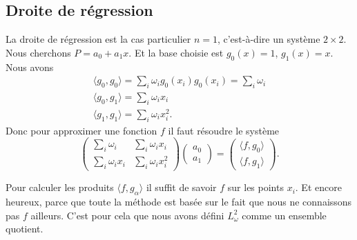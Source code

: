 \subsection{Droite de régression}

La droite de régression est la cas particulier \( n=1\), c'est-à-dire un système \( 2\times 2\). Nous cherchons \( P=a_0+a_1x\). Et la base choisie est \( g_0(x)=1\), \( g_1(x)=x\). Nous avons
\begin{subequations}
	\begin{align}
		\langle g_0, g_0\rangle =\sum_i\omega_ig_0(x_i)g_0(x_i)=\sum_i\omega_i \\
		\langle g_0, g_1\rangle =\sum_i\omega_ix_i                             \\
		\langle g_1, g_1\rangle =\sum_i\omega_ix_i^2.
	\end{align}
\end{subequations}
Donc pour approximer une fonction \( f\) il faut résoudre le système
\begin{equation}
	\begin{pmatrix}
		\sum_i\omega_i    & \sum_i\omega_ix_i   \\
		\sum_i\omega_ix_i & \sum_i\omega_ix_i^2
	\end{pmatrix}\begin{pmatrix}
		a_0 \\
		a_1
	\end{pmatrix}=
	\begin{pmatrix}
		\langle f, g_0\rangle \\
		\langle f, g_1\rangle
	\end{pmatrix}.
\end{equation}

Pour calculer les produits \( \langle f, g_{\alpha}\rangle \) il suffit de savoir \( f\) sur les points \( x_i\). Et encore heureux, parce que toute la méthode est basée sur le fait que nous ne connaissons pas \( f\) ailleurs. C'est pour cela que nous avons défini \( L^2_{\omega}\) comme un ensemble quotient.

